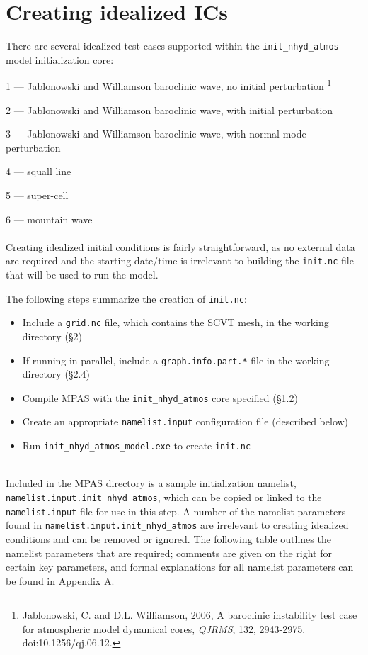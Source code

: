 \documentclass[11pt]{report}
\begin{document}
\section{Creating idealized ICs}

There are several idealized test cases supported within the {\tt init\_nhyd\_atmos} model initialization core:

1 --- Jablonowski and Williamson baroclinic wave, no initial perturbation
\footnote{Jablonowski, C. and D.L. Williamson, 2006, A baroclinic instability test case for atmospheric model dynamical cores, {\em QJRMS}, 132, 2943-2975. doi:10.1256/qj.06.12.}

2 --- Jablonowski and Williamson baroclinic wave, with initial perturbation

3 --- Jablonowski and Williamson baroclinic wave, with normal-mode perturbation

4 --- squall line

5 --- super-cell

6 --- mountain wave\\
\\
Creating idealized initial conditions is fairly straightforward, as no external data are required and the starting date/time is irrelevant to building the {\tt init.nc} file that will be used to run the model.

The following steps summarize the creation of {\tt init.nc}:

\begin{itemize}
\item Include a {\tt grid.nc} file, which contains the SCVT mesh, in the working directory (\S 2)
\item If running in parallel, include a {\tt graph.info.part.*} file in the working directory (\S 2.4)
\item Compile MPAS with the {\tt init\_nhyd\_atmos} core specified (\S 1.2)
\item Create an appropriate {\tt namelist.input} configuration file (described below)
\item Run {\tt init\_nhyd\_atmos\_model.exe} to create {\tt init.nc}
\end{itemize}~\\

Included in the MPAS directory is a sample initialization namelist, {\tt namelist.input.init\_nhyd\_atmos}, which can be copied or linked to the {\tt namelist.input} file for use in this step.  A number of the namelist parameters found in {\tt namelist.input.init\_nhyd\_atmos} are irrelevant to creating idealized conditions and can be removed or ignored.  The following table outlines the namelist parameters that are required; comments are given on the right for certain key parameters, and formal explanations for all namelist parameters can be found in Appendix A.
\end{document}
